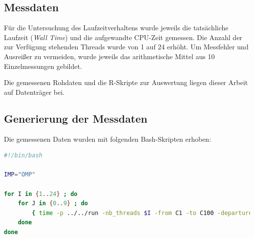 \documentclass[11pt]{scrartcl}
\begin{document}
\subsection{Messdaten}

Für die Untersuchung des Laufzeitverhaltens wurde jeweils die tatsächliche Laufzeit (\emph{Wall Time}) und die aufgewandte CPU-Zeit gemessen. Die Anzahl der zur Verfügung stehenden Threads wurde von 1 auf 24 erhöht. Um Messfehler und Ausreißer zu vermeiden, wurde jeweils das arithmetische Mittel aus 10 Einzelmessungen gebildet.

Die gemessenen Rohdaten und die R-Skripte zur Auswertung liegen dieser Arbeit auf Datenträger bei.

\subsection{Generierung der Messdaten}

Die gemessenen Daten wurden mit folgenden Bash-Skripten erhoben:

\begin{lstlisting}[language=Bash,caption=Bash-Skript zur Erfassung der Laufzeiten]
#!/bin/bash

IMP="OMP"

for I in {1..24} ; do
	for J in {0..9} ; do
		{ time -p ../../run -nb_threads $I -from C1 -to C100 -departure_time_min 00000000100000 -departure_time_max 00000000450000 -arrival_time_min 00000000550000 -arrival_time_max 00000000900000 -max_layover 1000 -vacation_time_min 50000 -vacation_time_max 200000 -flights flights.txt -alliances alliances.txt -work_hard_file work_hard.txt -play_hard_file play_hard.txt -vacation_airports C{2..51}  ; } 2>&1 | awk "BEGIN { WALL=\"\" ; USER=\"\"; } { if(\$1 == \"real\") WALL=\$2 ; if(\$1 == \"user\") USER=\$2 } END { print \"$IMP;$I;\" WALL \";\" USER \";\" (USER/WALL) }" >> intel-benchmark-13-$(date +%s).csv
	done
done
\end{lstlisting}
\end{document}

